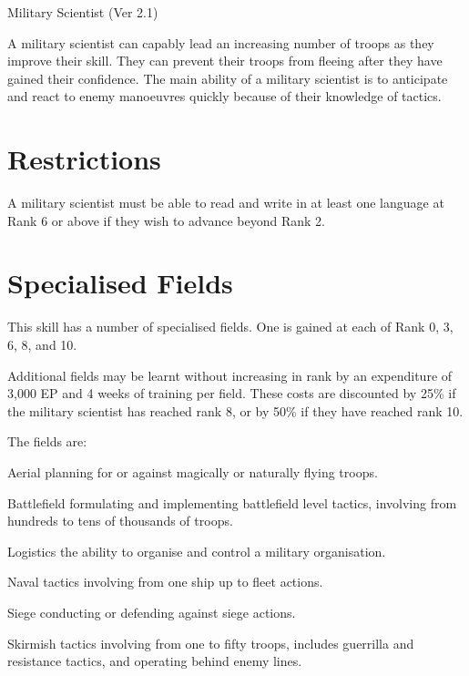 \begin{Chapter}{Military Scientist (Ver 2.1)}

A military scientist can capably lead an increasing number of troops
as they improve their skill. They can prevent their troops from
fleeing after they have gained their confidence. The main ability of a
military scientist is to anticipate and react to enemy manoeuvres
quickly because of their knowledge of tactics.

\section{Restrictions}

A military scientist must be able to read and write in at least one
language at Rank 6 or above if they wish to advance beyond Rank 2.

\section{Specialised Fields}

This skill has a number of specialised fields. One is gained at each
of Rank 0, 3, 6, 8, and 10.

Additional fields may be learnt without increasing in rank by an
expenditure of 3,000 EP and 4 weeks of training per field. These costs
are discounted by 25\% if the military scientist has reached rank 8,
or by 50\% if they have reached rank 10.

The fields are:
\begin{Description}

\item[Aerial] planning for or against magically or naturally flying
  troops.

\item[Battlefield] formulating and implementing battlefield level
  tactics, involving from hundreds to tens of thousands of troops.

\item[Logistics] the ability to organise and control a military
  organisation.

\item[Naval] tactics involving from one ship up to fleet actions.

\item[Siege] conducting or defending against siege actions.

\item[Skirmish] tactics involving from one to fifty troops, includes
  guerrilla and resistance tactics, and operating behind enemy lines.


\end{Description}
\end{Chapter}
